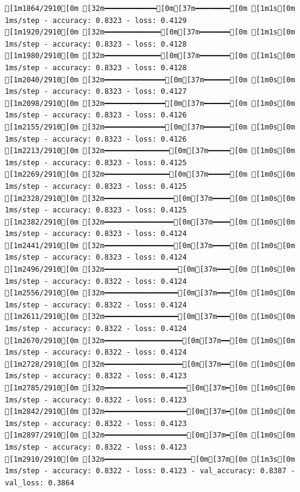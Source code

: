 \documentclass[
  letterpaper,
  DIV=11,
  numbers=noendperiod]{scrartcl}
\begin{document}
\begin{verbatim}
[1m1864/2910[0m [32m━━━━━━━━━━━━[0m[37m━━━━━━━━[0m [1m1s[0m 1ms/step - accuracy: 0.8323 - loss: 0.4129
[1m1920/2910[0m [32m━━━━━━━━━━━━━[0m[37m━━━━━━━[0m [1m1s[0m 1ms/step - accuracy: 0.8323 - loss: 0.4128
[1m1980/2910[0m [32m━━━━━━━━━━━━━[0m[37m━━━━━━━[0m [1m1s[0m 1ms/step - accuracy: 0.8323 - loss: 0.4128
[1m2040/2910[0m [32m━━━━━━━━━━━━━━[0m[37m━━━━━━[0m [1m0s[0m 1ms/step - accuracy: 0.8323 - loss: 0.4127
[1m2098/2910[0m [32m━━━━━━━━━━━━━━[0m[37m━━━━━━[0m [1m0s[0m 1ms/step - accuracy: 0.8323 - loss: 0.4126
[1m2155/2910[0m [32m━━━━━━━━━━━━━━[0m[37m━━━━━━[0m [1m0s[0m 1ms/step - accuracy: 0.8323 - loss: 0.4126
[1m2213/2910[0m [32m━━━━━━━━━━━━━━━[0m[37m━━━━━[0m [1m0s[0m 1ms/step - accuracy: 0.8323 - loss: 0.4125
[1m2269/2910[0m [32m━━━━━━━━━━━━━━━[0m[37m━━━━━[0m [1m0s[0m 1ms/step - accuracy: 0.8323 - loss: 0.4125
[1m2328/2910[0m [32m━━━━━━━━━━━━━━━━[0m[37m━━━━[0m [1m0s[0m 1ms/step - accuracy: 0.8323 - loss: 0.4125
[1m2382/2910[0m [32m━━━━━━━━━━━━━━━━[0m[37m━━━━[0m [1m0s[0m 1ms/step - accuracy: 0.8323 - loss: 0.4124
[1m2441/2910[0m [32m━━━━━━━━━━━━━━━━[0m[37m━━━━[0m [1m0s[0m 1ms/step - accuracy: 0.8323 - loss: 0.4124
[1m2496/2910[0m [32m━━━━━━━━━━━━━━━━━[0m[37m━━━[0m [1m0s[0m 1ms/step - accuracy: 0.8322 - loss: 0.4124
[1m2556/2910[0m [32m━━━━━━━━━━━━━━━━━[0m[37m━━━[0m [1m0s[0m 1ms/step - accuracy: 0.8322 - loss: 0.4124
[1m2611/2910[0m [32m━━━━━━━━━━━━━━━━━[0m[37m━━━[0m [1m0s[0m 1ms/step - accuracy: 0.8322 - loss: 0.4124
[1m2670/2910[0m [32m━━━━━━━━━━━━━━━━━━[0m[37m━━[0m [1m0s[0m 1ms/step - accuracy: 0.8322 - loss: 0.4124
[1m2728/2910[0m [32m━━━━━━━━━━━━━━━━━━[0m[37m━━[0m [1m0s[0m 1ms/step - accuracy: 0.8322 - loss: 0.4123
[1m2785/2910[0m [32m━━━━━━━━━━━━━━━━━━━[0m[37m━[0m [1m0s[0m 1ms/step - accuracy: 0.8322 - loss: 0.4123
[1m2842/2910[0m [32m━━━━━━━━━━━━━━━━━━━[0m[37m━[0m [1m0s[0m 1ms/step - accuracy: 0.8322 - loss: 0.4123
[1m2897/2910[0m [32m━━━━━━━━━━━━━━━━━━━[0m[37m━[0m [1m0s[0m 1ms/step - accuracy: 0.8322 - loss: 0.4123
[1m2910/2910[0m [32m━━━━━━━━━━━━━━━━━━━━[0m[37m[0m [1m3s[0m 1ms/step - accuracy: 0.8322 - loss: 0.4123 - val_accuracy: 0.8387 - val_loss: 0.3864
\end{verbatim}
\end{document}
